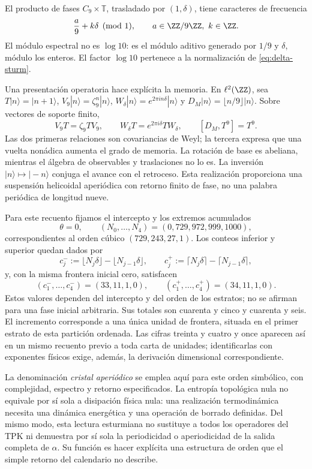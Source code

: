 El producto de fases \(C_9\times\mathbb T\), trasladado por \((1,\delta)\), tiene caracteres de frecuencia
\[
 \frac a9+k\delta\pmod1,\qquad a\in\ZZ/9\ZZ,\ k\in\ZZ.
\]
El módulo espectral no es \(\log10\): es el módulo aditivo generado por \(1/9\) y \(\delta\), módulo los enteros. El factor \(\log10\) pertenece a la normalización de \eqref{eq:delta-sturm}.

Una presentación operatoria hace explícita la memoria. En \(\ell^2(\ZZ)\), sea \(T|n\rangle=|n+1\rangle\), \(V_9|n\rangle=\zeta_9^n|n\rangle\), \(W_\delta|n\rangle=e^{2\pi i n\delta}|n\rangle\) y \(D_M|n\rangle=\lfloor n/9\rfloor|n\rangle\). Sobre vectores de soporte finito,
\begin{equation}
 V_9T=\zeta_9TV_9,\qquad
 W_\delta T=e^{2\pi i\delta}TW_\delta,\qquad
 [D_M,T^9]=T^9.
 \label{eq:weyl-relojes}
\end{equation}
Las dos primeras relaciones son covariancias de Weyl; la tercera expresa que una vuelta nonádica aumenta el grado de memoria. La rotación de base es abeliana, mientras el álgebra de observables y traslaciones no lo es. La inversión \(|n\rangle\mapsto|-n\rangle\) conjuga el avance con el retroceso. Esta realización proporciona una suspensión helicoidal aperiódica con retorno finito de fase, no una palabra periódica de longitud nueve.



Para este recuento fijamos el intercepto y los extremos acumulados
\[
 \theta=0,\qquad
 (N_0,\ldots,N_4)=(0,729,972,999,1000),
\]
correspondientes al orden cúbico \((729,243,27,1)\). Los conteos inferior y
superior quedan dados por
\[
 c_j^-:=\lfloor N_j\delta\rfloor-\lfloor N_{j-1}\delta\rfloor,
 \qquad
 c_j^+:=\lceil N_j\delta\rceil-\lceil N_{j-1}\delta\rceil,
\]
y, con la misma frontera inicial cero, satisfacen
\[
 (c_1^-,\ldots,c_4^-)=(33,11,1,0),\qquad
 (c_1^+,\ldots,c_4^+)=(34,11,1,0).
\]
Estos valores dependen del intercepto y del
orden de los estratos; no se afirman para una fase inicial arbitraria. Sus
totales son cuarenta y cinco y cuarenta y seis. El incremento corresponde a
una única unidad de frontera, situada en el primer estrato de esta partición
ordenada. Las cifras treinta y cuatro y once aparecen así en un mismo recuento
previo a toda carta de unidades; identificarlas con exponentes físicos exige,
además, la derivación dimensional correspondiente.

La denominación \emph{cristal aperiódico} se emplea aquí para este orden simbólico, con complejidad, espectro y retorno especificados. La entropía topológica nula no equivale por sí sola a disipación física nula: una realización termodinámica necesita una dinámica energética y una operación de borrado definidas. Del mismo modo, esta lectura esturmiana no sustituye a todos los operadores del TPK ni demuestra por sí sola la periodicidad o aperiodicidad de la salida completa de \(\alpha\). Su función es hacer explícita una estructura de orden que el simple retorno del calendario no describe.




